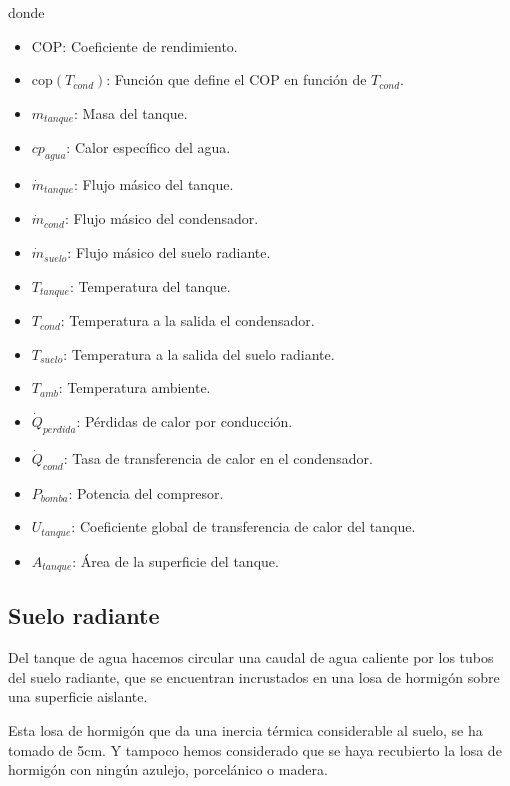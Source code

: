donde

\begin{itemize}
	\item $\text{COP}$: Coeficiente de rendimiento.
	\item $\text{cop}(T_{cond})$: Función que define el COP en función de $T_{cond}$.
	\item $m_{tanque}$: Masa del tanque.
	\item $cp_{agua}$: Calor específico del agua.
	\item $\dot{m}_{tanque}$: Flujo másico del tanque.
	\item $\dot{m}_{cond}$: Flujo másico del condensador.
	\item $\dot{m}_{suelo}$: Flujo másico del suelo radiante.
	\item $T_{tanque}$: Temperatura del tanque.
	\item $T_{cond}$: Temperatura a la salida el condensador.
	\item $T_{suelo}$: Temperatura a la salida del suelo radiante.
	\item $T_{amb}$: Temperatura ambiente.
	\item $\dot{Q}_{perdida}$: Pérdidas de calor por conducción.
	\item $\dot{Q}_{cond}$: Tasa de transferencia de calor en el condensador.
	\item $P_{bomba}$: Potencia del compresor.
	\item $U_{tanque}$: Coeficiente global de transferencia de calor del tanque.
	\item $A_{tanque}$: Área de la superficie del tanque.
\end{itemize}


\subsection{Suelo radiante}

Del tanque de agua hacemos circular una caudal de agua caliente por los
tubos del suelo radiante, que se encuentran incrustados en una losa de hormigón
sobre una superficie aislante.

Esta losa de hormigón que da una inercia térmica considerable al suelo, se ha
tomado de 5cm. Y tampoco hemos considerado que se haya recubierto la losa de
hormigón con ningún azulejo, porcelánico o madera.

